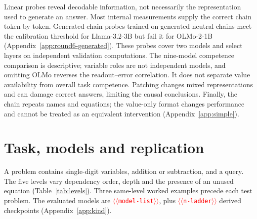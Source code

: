 \documentclass[11pt]{article}
\providecommand{\NUM}[1]{\textcolor{red}{$\langle\langle$\texttt{#1}$\rangle\rangle$}}
\begin{document}
Linear probes reveal decodable information, not necessarily the representation used to generate
an answer. Most internal measurements supply the correct chain token by token. Generated-chain
probes trained on generated neutral chains meet the calibration threshold for Llama-3.2-3B
but fail it for OLMo-2-1B (Appendix~\ref{app:round6-generated}). These probes cover two models
and select layers on independent validation computations. The nine-model competence comparison is descriptive;
variable roles are not independent models, and omitting OLMo reverses the readout--error
correlation. It does not separate value availability from overall task competence.
Patching changes mixed representations and can damage
correct answers, limiting the causal conclusions. Finally, the chain repeats names and equations;
the value-only format changes performance and cannot be treated as an equivalent intervention
(Appendix~\ref{app:simple}).



\appendix

\section{Task, models and replication}
\label{app:task}
A problem contains single-digit variables, addition or subtraction, and a query. The five
levels vary dependency order, depth and the presence of an unused equation
(Table~\ref{tab:levels}). Three same-level worked examples precede each test problem.
The evaluated models are \NUM{model-list}, plus \NUM{n-ladder} derived checkpoints
(Appendix~\ref{app:kind}).

\begin{table}[t]
\centering\small\setlength{\tabcolsep}{4pt}
\caption{The five levels of \citet{kudo2026faithful}: additions or subtractions needed
(\emph{Steps}), variables unresolved when first read (\emph{Held}), and unused equations
(\emph{Distr.}). At level~1 the intermediate value is stated rather than computed.}
\label{tab:levels}
\end{table}
\end{document}
